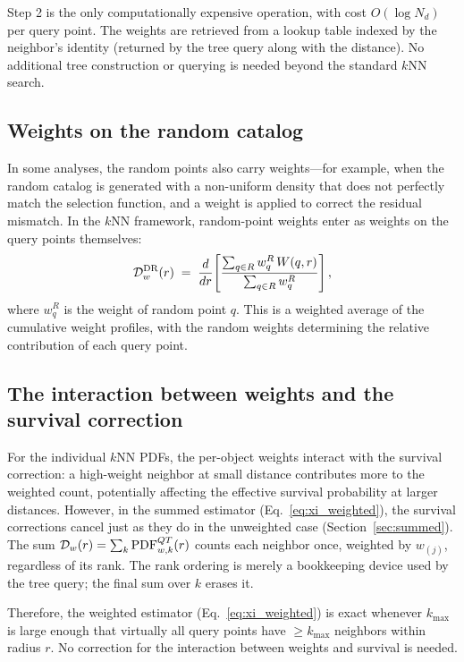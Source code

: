 Step 2 is the only computationally expensive operation, with cost $O(\log N_d)$ per query point.  The weights are retrieved from a lookup table indexed by the neighbor's identity (returned by the tree query along with the distance).  No additional tree construction or querying is needed beyond the standard $k$NN search.

\subsection{Weights on the random catalog}
\label{sec:random_weights}

In some analyses, the random points also carry weights---for example, when the random catalog is generated with a non-uniform density that does not perfectly match the selection function, and a weight is applied to correct the residual mismatch.  In the $k$NN framework, random-point weights enter as weights on the query points themselves:
\begin{equation}
  \mathcal{D}^{\mathrm{DR}}_w(r) \;=\; \frac{d}{dr}\Biggl[\frac{\sum_{q \in R} w_q^R\,W(q, r)}{\sum_{q \in R} w_q^R}\Biggr]\,,
  \label{eq:DR_random_weighted}
\end{equation}
where $w_q^R$ is the weight of random point $q$.  This is a weighted average of the cumulative weight profiles, with the random weights determining the relative contribution of each query point.

\subsection{The interaction between weights and the survival correction}
\label{sec:weight_survival}

For the individual $k$NN PDFs, the per-object weights interact with the survival correction: a high-weight neighbor at small distance contributes more to the weighted count, potentially affecting the effective survival probability at larger distances.  However, in the summed estimator (Eq.~\ref{eq:xi_weighted}), the survival corrections cancel just as they do in the unweighted case (Section~\ref{sec:summed}).  The sum $\mathcal{D}_w(r) = \sum_k \mathrm{PDF}^{QT}_{w,k}(r)$ counts each neighbor once, weighted by $w_{(j)}$, regardless of its rank.  The rank ordering is merely a bookkeeping device used by the tree query; the final sum over $k$ erases it.

Therefore, the weighted estimator (Eq.~\ref{eq:xi_weighted}) is exact whenever $k_{\max}$ is large enough that virtually all query points have $\geq k_{\max}$ neighbors within radius $r$.  No correction for the interaction between weights and survival is needed.

